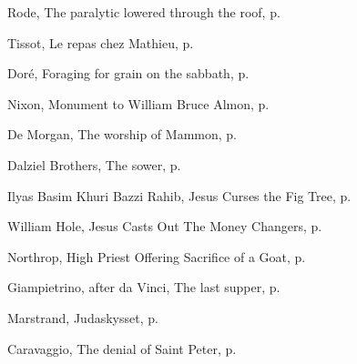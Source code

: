 \documentclass[10pt,a5paper,twoside]{article}
\newcommand{\artcredit}[3]{#2, #3, p.~\pageref{fig:#1}}
\begin{document}
\artcredit{healing-the-paralytic}{Rode}{The paralytic lowered through the roof}

\artcredit{meal-in-house-of-matthew}{Tissot}{Le repas chez Mathieu}

\artcredit{plucking-corn-on-the-sabbath}{Doré}{Foraging for grain on the sabbath}

\artcredit{good-samaritan}{Nixon}{Monument to William Bruce Almon}

\artcredit{mammon}{De Morgan}{The worship of Mammon}

\artcredit{sower}{Dalziel Brothers}{The sower}

\artcredit{cursing-fig-tree}{Ilyas Basim Khuri Bazzi Rahib}{Jesus Curses the Fig Tree}

\artcredit{money-changers-william-hole}{William Hole}{Jesus Casts Out The Money Changers}

\artcredit{altar}{Northrop}{High Priest Offering Sacrifice of a Goat}

\artcredit{last-supper}{Giampietrino, after da Vinci}{The last supper}

\artcredit{judas-kiss}{Marstrand}{Judaskysset}

\artcredit{denial-of-saint-peter}{Caravaggio}{The denial of Saint Peter}
\end{document}
